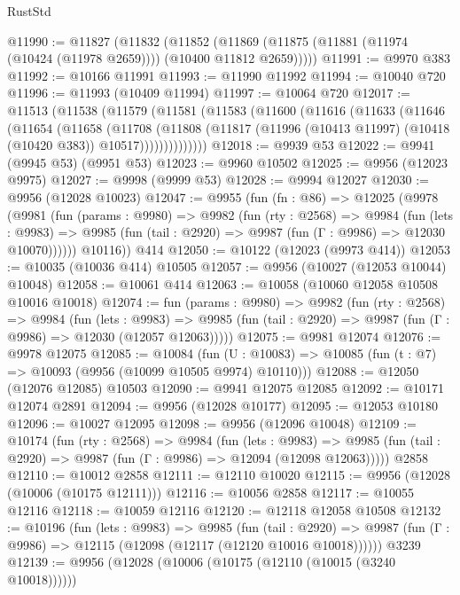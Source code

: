 \begin{lexlean}{RustStd}
\begin{coremodule}
@11990 := @11827
    (@11832
      (@11852 (@11869 (@11875 (@11881 (@11974 (@10424 (@11978 @2659)))) (@10400 @11812 @2659)))))
@11991 := @9970 @383
@11992 := @10166 @11991
@11993 := @11990 @11992
@11994 := @10040 @720
@11996 := @11993 (@10409 @11994)
@11997 := @10064 @720
@12017 := @11513
    (@11538
      (@11579
        (@11581
          (@11583
            (@11600
              (@11616
                (@11633
                  (@11646
                    (@11654
                      (@11658
                        (@11708
                          (@11808
                            (@11817
                              (@11996 (@10413 @11997) (@10418 (@10420 @383)) @10517))))))))))))))
@12018 := @9939 @53
@12022 := @9941 (@9945 @53) (@9951 @53)
@12023 := @9960 @10502
@12025 := @9956 (@12023 @9975)
@12027 := @9998 (@9999 @53)
@12028 := @9994 @12027
@12030 := @9956 (@12028 @10023)
@12047 := @9955
    (fun (fn : @86) =>
    @12025
      (@9978
        (@9981
          (fun (params : @9980) =>
          @9982
            (fun (rty : @2568) =>
            @9984
              (fun (lets : @9983) =>
              @9985 (fun (tail : @2920) => @9987 (fun (Γ : @9986) => @12030 @10070))))))
        @10116))
    @414
@12050 := @10122 (@12023 (@9973 @414))
@12053 := @10035 (@10036 @414) @10505
@12057 := @9956 (@10027 (@12053 @10044) @10048)
@12058 := @10061 @414
@12063 := @10058 (@10060 @12058 @10508 @10016 @10018)
@12074 := fun (params : @9980) =>
  @9982
    (fun (rty : @2568) =>
    @9984
      (fun (lets : @9983) =>
      @9985 (fun (tail : @2920) => @9987 (fun (Γ : @9986) => @12030 (@12057 @12063)))))
@12075 := @9981 @12074
@12076 := @9978 @12075
@12085 := @10084
    (fun (U : @10083) => @10085 (fun (t : @7) => @10093 (@9956 (@10099 @10505 @9974) @10110)))
@12088 := @12050 (@12076 @12085) @10503
@12090 := @9941 @12075 @12085
@12092 := @10171 @12074 @2891
@12094 := @9956 (@12028 @10177)
@12095 := @12053 @10180
@12096 := @10027 @12095
@12098 := @9956 (@12096 @10048)
@12109 := @10174
    (fun (rty : @2568) =>
    @9984
      (fun (lets : @9983) =>
      @9985 (fun (tail : @2920) => @9987 (fun (Γ : @9986) => @12094 (@12098 @12063)))))
    @2858
@12110 := @10012 @2858
@12111 := @12110 @10020
@12115 := @9956 (@12028 (@10006 (@10175 @12111)))
@12116 := @10056 @2858
@12117 := @10055 @12116
@12118 := @10059 @12116
@12120 := @12118 @12058 @10508
@12132 := @10196
    (fun (lets : @9983) =>
    @9985
      (fun (tail : @2920) =>
      @9987 (fun (Γ : @9986) => @12115 (@12098 (@12117 (@12120 @10016 @10018))))))
    @3239
@12139 := @9956 (@12028 (@10006 (@10175 (@12110 (@10015 (@3240 @10018))))))

\end{coremodule}
\end{lexlean}
